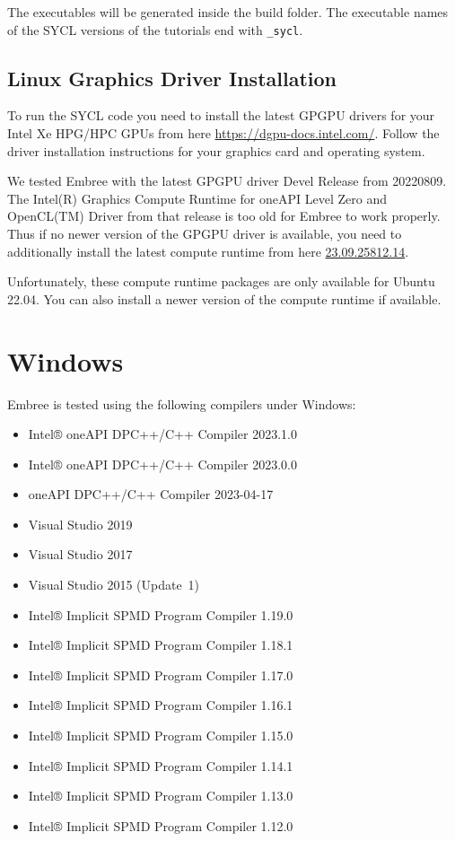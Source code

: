 The executables will be generated inside the build folder. The
executable names of the SYCL versions of the tutorials end with
\texttt{\_sycl}.

\subsection{Linux Graphics Driver
Installation}\label{linux-graphics-driver-installation}

To run the SYCL code you need to install the latest GPGPU drivers for
your Intel Xe HPG/HPC GPUs from here \url{https://dgpu-docs.intel.com/}.
Follow the driver installation instructions for your graphics card and
operating system.

We tested Embree with the latest GPGPU driver Devel Release from
20220809. The Intel(R) Graphics Compute Runtime for oneAPI Level Zero
and OpenCL(TM) Driver from that release is too old for Embree to work
properly. Thus if no newer version of the GPGPU driver is available, you
need to additionally install the latest compute runtime from here
\href{https://github.com/intel/compute-runtime/releases/tag/23.09.25812.14}{23.09.25812.14}.

Unfortunately, these compute runtime packages are only available for
Ubuntu 22.04. You can also install a newer version of the compute
runtime if available.

\section{Windows}\label{windows}

Embree is tested using the following compilers under Windows:

\begin{itemize}
\tightlist
\item
  Intel® oneAPI DPC++/C++ Compiler 2023.1.0
\item
  Intel® oneAPI DPC++/C++ Compiler 2023.0.0
\item
  oneAPI DPC++/C++ Compiler 2023-04-17
\item
  Visual Studio 2019
\item
  Visual Studio 2017
\item
  Visual Studio 2015 (Update~1)
\item
  Intel® Implicit SPMD Program Compiler 1.19.0
\item
  Intel® Implicit SPMD Program Compiler 1.18.1
\item
  Intel® Implicit SPMD Program Compiler 1.17.0
\item
  Intel® Implicit SPMD Program Compiler 1.16.1
\item
  Intel® Implicit SPMD Program Compiler 1.15.0
\item
  Intel® Implicit SPMD Program Compiler 1.14.1
\item
  Intel® Implicit SPMD Program Compiler 1.13.0
\item
  Intel® Implicit SPMD Program Compiler 1.12.0
\end{itemize}

